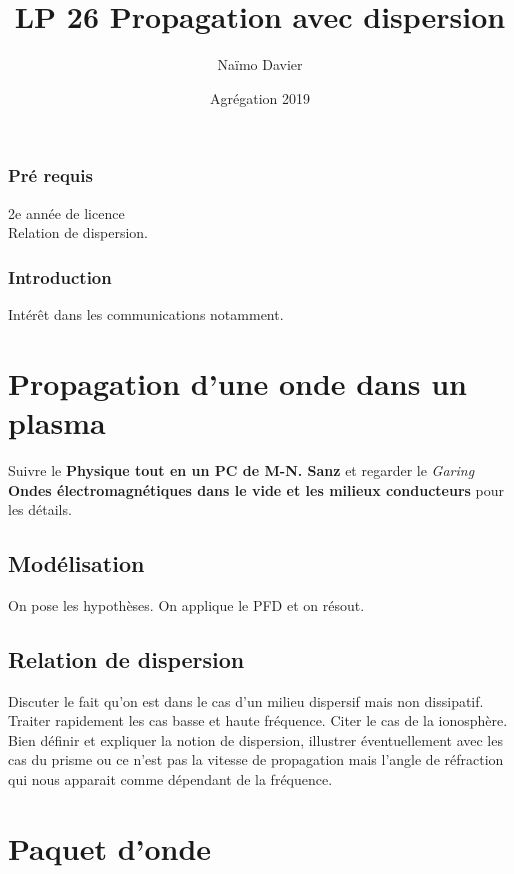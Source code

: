 \documentclass[12pt,prb,aps,epsf]{article}
\begin{document}
	
	\title{LP 26 Propagation avec dispersion}
	\author{Naïmo Davier}
	\date{Agrégation 2019}
	
	\maketitle
	
	\tableofcontents
	
	\pagebreak
	
\subsubsection{Pré requis}
2e année de licence\\
Relation de dispersion.

\subsubsection{Introduction}
Intérêt dans les communications notamment.

\section{Propagation d'une onde dans un plasma}
Suivre le \textbf{Physique tout en un PC de M-N. Sanz} et regarder le \textit{Garing} \textbf{Ondes électromagnétiques dans le vide et les milieux conducteurs} pour les détails.

\subsection{Modélisation}
On pose les hypothèses.
On applique le PFD et on résout.

\subsection{Relation de dispersion}
Discuter le fait qu'on est dans le cas d'un milieu dispersif mais non dissipatif. Traiter rapidement les cas basse et haute fréquence. Citer le cas de la ionosphère.\\

Bien définir et expliquer la notion de dispersion, illustrer éventuellement avec les cas du prisme ou ce n'est pas la vitesse de propagation mais l'angle de réfraction qui nous apparait comme dépendant de la fréquence.

\section{Paquet d'onde}
\end{document}
